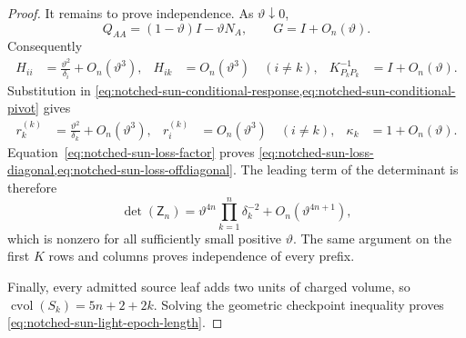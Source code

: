 \begin{proof}
It remains to prove independence.  As $\vartheta\downarrow0$,
\begin{equation*}
 Q_{AA}
 =(1-\vartheta)I-\vartheta N_A,
 \qquad
 G=I+O_n(\vartheta).
\end{equation*}
Consequently
\begin{align*}
 H_{ii}&=\frac{\vartheta^2}{\delta_i}
          +O_n(\vartheta^3),
 &H_{ik}&=O_n(\vartheta^3)\quad(i\neq k),
 &K_{P_kP_k}^{-1}&=I+O_n(\vartheta).
\end{align*}
Substitution in
\cref{eq:notched-sun-conditional-response,eq:notched-sun-conditional-pivot}
gives
\begin{align*}
 r_k^{(k)}
 &=\frac{\vartheta^2}{\delta_k}+O_n(\vartheta^3),
 &r_i^{(k)}&=O_n(\vartheta^3)\quad(i\neq k),
 &\kappa_k&=1+O_n(\vartheta).
\end{align*}
Equation~\eqref{eq:notched-sun-loss-factor} proves
\cref{eq:notched-sun-loss-diagonal,eq:notched-sun-loss-offdiagonal}.  The
leading term of the determinant is therefore
\begin{equation*}
 \det(\mathsf Z_n)
 =\vartheta^{4n}\prod_{k=1}^n\delta_k^{-2}
  +O_n(\vartheta^{4n+1}),
\end{equation*}
which is nonzero for all sufficiently small positive $\vartheta$.  The same
argument on the first $K$ rows and columns proves independence of every
prefix.

Finally, every admitted source leaf adds two units of charged volume, so
$\operatorname{cvol}(S_k)=5n+2+2k$.  Solving the geometric checkpoint
inequality proves
\cref{eq:notched-sun-light-epoch-length}.
\end{proof}

